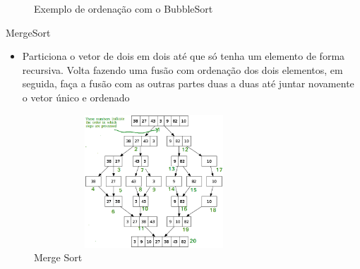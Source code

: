 \begin{frame}{}
	\begin{figure}[h!]
		\centering    
		  \caption{Exemplo de ordenação com o BubbleSort}
	 \end{figure} 
\end{frame}

\begin{frame}
	\begin{block}{MergeSort}
		\begin{itemize}
			\item Particiona o vetor de dois em dois até que só tenha um elemento de forma recursiva. Volta fazendo uma fusão com ordenação dos dois elementos, em seguida, faça a fusão com as outras partes duas a duas até juntar novamente o vetor único e ordenado
		\end{itemize}
	\end{block}
\end{frame}

\begin{frame}	
	\begin{block}{}	
		 \begin{figure}[!htb]
			\centering	  				
			\includegraphics[height=5cm, width = 9cm]{./pic/Merge-Sort-Tutorial.png}
			\caption{Merge Sort}
			\label{fig_merge}
		\end{figure}
	\end{block}
\end{frame}

